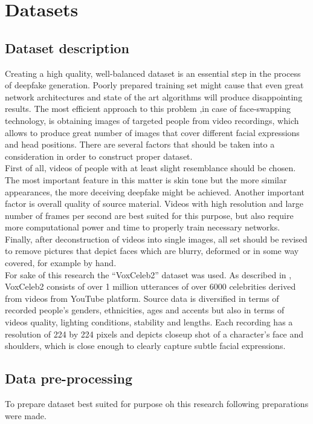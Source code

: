 \chapter{Datasets}
\section{Dataset description}
Creating a high quality, well-balanced dataset is an essential step in the process of deepfake generation. Poorly prepared training set might cause that even great network architectures and state of the art algorithms will produce disappointing results. The most efficient approach to this problem ,in case of face-swapping technology, is obtaining images of targeted people from video recordings, which allows to produce great number of images that cover different facial expressions and head positions. There are several factors that should be taken into a consideration in order to construct proper dataset.\\

First of all, videos of people with at least slight resemblance should be chosen. The most important feature in this matter is skin tone but the more similar appearances, the more deceiving deepfake might be achieved. Another important factor is overall quality of source material. Videos with high resolution and large number of frames per second are best suited for this purpose, but also require more computational power and time to properly train necessary networks. Finally, after deconstruction of videos into single images, all set should be revised to remove pictures that depict faces which are blurry, deformed or in some way covered, for example by hand.\\

For sake of this research the ``VoxCeleb2'' dataset was used. As described in \cite{voxceleb2_bib}, VoxCeleb2 consists of over 1 million utterances of over 6000 celebrities derived from videos from YouTube platform. Source data is diversified in terms of recorded people's genders, ethnicities, ages and accents but also in terms of videos quality, lighting conditions, stability and lengths. Each recording has a resolution of 224 by 224 pixels and depicts closeup shot of a character's face and shoulders, which is close enough to clearly capture subtle facial expressions.

\section{Data pre-processing}
To prepare dataset best suited for purpose oh this research following preparations were made.